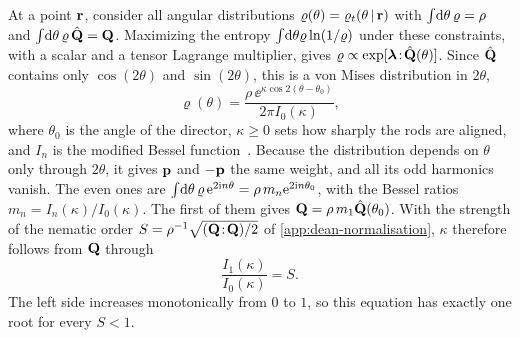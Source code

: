 \documentclass[aps,pre,reprint,superscriptaddress,longbibliography,nofootinbib
]{revtex4-2}
\begin{document}
At a point $\mathbf{r}$, consider all angular distributions
$\varrho(\theta) = \varrho_t(\theta \,|\, \mathbf{r})$ with
$\int\!\mathrm{d}\theta\,\varrho=\rho$ and
$\int\!\mathrm{d}\theta\,\varrho\,\hat{\mathbf{Q}}=\mathbf{Q}$. Maximizing the
entropy $\int\!\mathrm{d}\theta\varrho\ln(1/\varrho)$ under these
constraints, with a scalar and a tensor Lagrange
multiplier, gives
$\varrho\propto\exp[\boldsymbol\lambda\!:\!\hat{\mathbf{Q}}(\theta)]$. Since
$\hat{\mathbf{Q}}$ contains only $\cos(2\theta)$ and $\sin(2\theta)$,
this is a von Mises distribution in $2\theta$,
\begin{equation}
  \label{eq:von-mises}
  \varrho(\theta)=\frac{\rho\,\ee^{\kappa\cos2(\theta-\theta_0)}}{2\pi I_0(\kappa)},
\end{equation} 
where $\theta_0$ is the angle of the director, $\kappa\ge0$
sets how sharply the rods are aligned, and $I_n$ is the
modified Bessel function~\cite{olver2010nist}. Because the
distribution depends on $\theta$ only through $2\theta$, it
gives $\mathbf{p}$ and $-\mathbf{p}$ the same weight, and all its odd
harmonics vanish. The even ones are
$\int\!\mathrm{d}\theta\,\varrho\,\mathrm{e}^{2\mathrm{i}
n\theta}=\rho\,m_n\mathrm{e}^{2\mathrm{i} n\theta_0}$, with the Bessel
ratios $m_n=I_n(\kappa)/I_0(\kappa)$. The first of them
gives $\mathbf{Q}=\rho\,m_1\hat{\mathbf{Q}}(\theta_0)$. With the strength of
the nematic order $S=\rho^{-1}\sqrt{(\mathbf{Q}\!:\!\mathbf{Q})/2}$ of
\cref{app:dean-normalisation}, $\kappa$ therefore follows
from $\mathbf{Q}$ through
\begin{equation}
  \label{eq:kappa-S}
  \frac{I_1(\kappa)}{I_0(\kappa)}=S .
\end{equation}
The left side increases monotonically from $0$ to $1$, so
this equation has exactly one root for every $S<1$.
\end{document}
